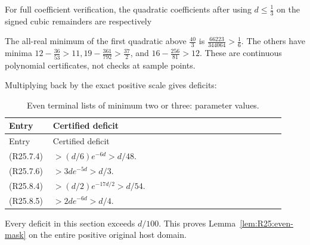 



For full coefficient verification, the quadratic coefficients after using \(d\le \frac{1}{3}\) on the signed cubic remainders are respectively


The all-real minimum of the first quadratic above \(\frac{40}{3}\) is \(\frac{66223}{344064}>\frac{1}{6}\). The others have minima \(12-\frac{36}{53}>11,\allowbreak \allowbreak  19-\frac{361}{792}>\frac{37}{2}\), and \(16-\frac{256}{81}>12\). These are continuous polynomial certificates, not checks at sample points.

Multiplying back by the exact positive scale gives deficits:


\begingroup\small
\setlength{\tabcolsep}{3pt}
\setlength{\LTleft}{0pt}\setlength{\LTright}{\fill}
\begin{longtable}{@{}p{0.1200\linewidth}p{0.8000\linewidth}@{}}
\caption{Even terminal lists of minimum two or three: parameter values.}\label{tab:parameters:r2-c025:3}\\
\toprule
Entry & Certified deficit \\
\midrule\endfirsthead
\toprule
Entry & Certified deficit \\
\midrule\endhead
\bottomrule\endfoot
(R25.7.4) & \(>(d/6)e^{-6d}>d/48\). \\
\addlinespace[2pt]
(R25.7.6) & \(>3d e^{-5d}>d/3\). \\
\addlinespace[2pt]
(R25.8.4) & \(>(d/2)e^{-17d/2}>d/54\). \\
\addlinespace[2pt]
(R25.8.5) & \(>2d e^{-6d}>d/4\). \\
\end{longtable}
\endgroup


Every deficit in this section exceeds \(d/100\). This proves Lemma~\ref{lem:R25:even-mask} on the entire positive original host domain.

